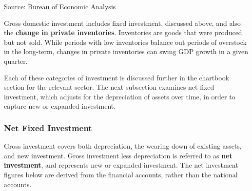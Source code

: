 \documentclass{report}
\newcommand{\tbllink}[1]{\href{https://raw.githubusercontent.com/bdecon/US-chartbook/master/chartbook/data/#1}{\faTable}}
\begin{document}
{\begin{minipage}{1.0\textwidth}
\footnotesize{Source: Bureau of Economic Analysis} \hfill \tbllink{inv.csv} 
\vspace{1.5mm}

\small Gross domestic investment includes fixed investment, discussed above, and also the \textbf{change in private inventories}. Inventories are goods that were produced but not sold. While periods with low inventories balance out periods of overstock in the long-term, changes in private inventories can swing GDP growth in a given quarter. 

 

Each of these categories of investment is discussed further in the chartbook section for the relevant sector. The next subsection examines net fixed investment, which adjusts for the depreciation of assets over time, in order to capture new or expanded investment. 
\end{minipage}
\newpage
\vspace*{-9mm}

\begin{minipage}{1.0\textwidth}   
\subsubsection*{Net Fixed Investment}
\vspace{-1mm}
\small Gross investment covers both depreciation, the wearing down of existing assets, and new investment. Gross investment less depreciation is referred to as \textbf{net investment}, and represents new or expanded investment. The net investment figures below are derived from the financial accounts, rather than the national accounts. 


\end{minipage}}
\end{document}
